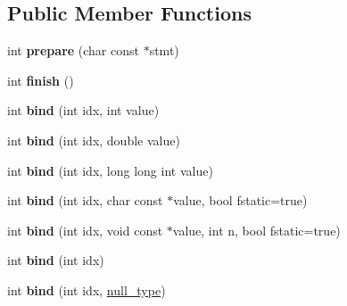 \subsection*{Public Member Functions}
\begin{DoxyCompactItemize}
\item 
\hypertarget{classsqlite3pp_1_1statement_aafcd2e3f9245e56a7beae1ad64215aa7}{int {\bfseries prepare} (char const $\ast$stmt)}\label{classsqlite3pp_1_1statement_aafcd2e3f9245e56a7beae1ad64215aa7}

\item 
\hypertarget{classsqlite3pp_1_1statement_a5c8ffdb4c3fda921cd70223496591933}{int {\bfseries finish} ()}\label{classsqlite3pp_1_1statement_a5c8ffdb4c3fda921cd70223496591933}

\item 
\hypertarget{classsqlite3pp_1_1statement_af6671aba58cf79f489212123380b1971}{int {\bfseries bind} (int idx, int value)}\label{classsqlite3pp_1_1statement_af6671aba58cf79f489212123380b1971}

\item 
\hypertarget{classsqlite3pp_1_1statement_a1f56c2c4135b96720d319ffeaeccb4a3}{int {\bfseries bind} (int idx, double value)}\label{classsqlite3pp_1_1statement_a1f56c2c4135b96720d319ffeaeccb4a3}

\item 
\hypertarget{classsqlite3pp_1_1statement_a4a14707c8b72fa2f3d09bc3765a01bfc}{int {\bfseries bind} (int idx, long long int value)}\label{classsqlite3pp_1_1statement_a4a14707c8b72fa2f3d09bc3765a01bfc}

\item 
\hypertarget{classsqlite3pp_1_1statement_a0c02d737b01faeeab329226b9fa9debd}{int {\bfseries bind} (int idx, char const $\ast$value, bool fstatic=true)}\label{classsqlite3pp_1_1statement_a0c02d737b01faeeab329226b9fa9debd}

\item 
\hypertarget{classsqlite3pp_1_1statement_a34025ae792bd02f38221a82dd3b887f3}{int {\bfseries bind} (int idx, void const $\ast$value, int n, bool fstatic=true)}\label{classsqlite3pp_1_1statement_a34025ae792bd02f38221a82dd3b887f3}

\item 
\hypertarget{classsqlite3pp_1_1statement_af980d3c0cb73bcdff105c58a46dc50e3}{int {\bfseries bind} (int idx)}\label{classsqlite3pp_1_1statement_af980d3c0cb73bcdff105c58a46dc50e3}

\item 
\hypertarget{classsqlite3pp_1_1statement_a1a9b9dd56d2b6aada8850e6ad24f2288}{int {\bfseries bind} (int idx, \hyperlink{classsqlite3pp_1_1null__type}{null\-\_\-type})}\label{classsqlite3pp_1_1statement_a1a9b9dd56d2b6aada8850e6ad24f2288}


\end{DoxyCompactItemize}
